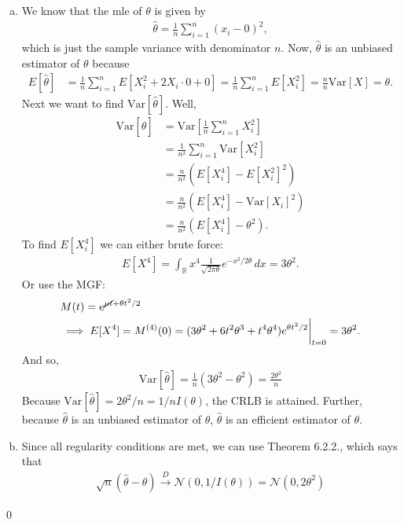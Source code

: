 \documentclass{book}
\theoremstyle{definition}
\newcommand{\nn}{\nonumber}
\newcommand{\Var}{\text{Var}}
\newcommand{\N}{\mathcal{N}}
\newcommand{\f}[2]{\frac{#1}{#2}}
\newcommand{\lp}{\left(}
\newcommand{\rp}{\right)}
\newcommand{\lb}{\left[}
\newcommand{\rb}{\right]}
\begin{document}
\begin{enumerate}[(a)]
	\item We know that the mle of $\theta$ is given by
	\begin{align}
	\hat\theta = \f{1}{n}\sum^n_{i=1}(x_i - 0)^2,
	\end{align}
	which is just the sample variance with denominator $n$. Now, $\hat\theta$ is an unbiased estimator of $\theta$ because
	\begin{align}
	E[\hat\theta] &= \f{1}{n}\sum^n_{i=1}E[X_i^2 + 2X_i\cdot 0 + 0] = \f{1}{n}\sum^n_{i=1}E[X_i^2]= \f{n}{n}\Var[X] = \theta.
	\end{align} 
	Next we want to find $\Var[\hat\theta]$. Well,
	\begin{align}
	\Var[\hat\theta] &= \Var\lb \f{1}{n}\sum^n_{i=1} X_i^2 \rb\nn\\
	&= \f{1}{n^2}\sum^n_{i=1} \Var[X_i^2] \nn\\
	&= \f{n}{n^2}\lp E[X_i^4] - E[X_i^2]^2 \rp\nn\\
	&= \f{n}{n^2}\lp E[X_i^4] - \Var[X_i]^2 \rp\nn\\
	&= \f{n}{n^2}\lp E[X_i^4] - \theta^2 \rp.
	\end{align}
	To find $E[X_i^4]$ we can either brute force:
	\begin{align}
	E[X^4] = \int_\mathbb{R}x^4 \f{1}{\sqrt{2\pi \theta}}e^{-x^2/2\theta}\,dx = 3\theta^2.
	\end{align}
	Or use the MGF:
	\begin{align}
	&M(t) = e^{\cancel{\mu t} + \theta t^2/2}\nn\\
	& \implies E[X^4] = M^{(4)}(0) = (3\theta^2 + 6 t^2 \theta^3 + t^4\theta^4)e^{\theta t^2/2}\bigg\vert_{t=0} = 3\theta^2.
	\end{align}
	And so,
	\begin{align}
	\Var[\hat\theta] = \f{1}{n}\lp 3\theta^2 - \theta^2 \rp = \boxed{\f{2\theta^2}{n}}
	\end{align}
	Because $\Var[\hat\theta] = 2\theta^2/n = 1/nI(\theta)$, the CRLB is attained. Further, because $\hat\theta$ is an unbiased estimator of $\theta$, $\hat\theta$ is an efficient estimator of $\theta$. 
	
	
	
	\item Since all regularity conditions are met, we can use Theorem 6.2.2., which says that 
	\begin{align}
	\sqrt{n}(\hat\theta - \theta) \xrightarrow{D} \N(0, 1/I(\theta)) = \boxed{\N \lp 0,2\theta^2\rp}
	\end{align}
\end{enumerate}\qed
\end{document}
